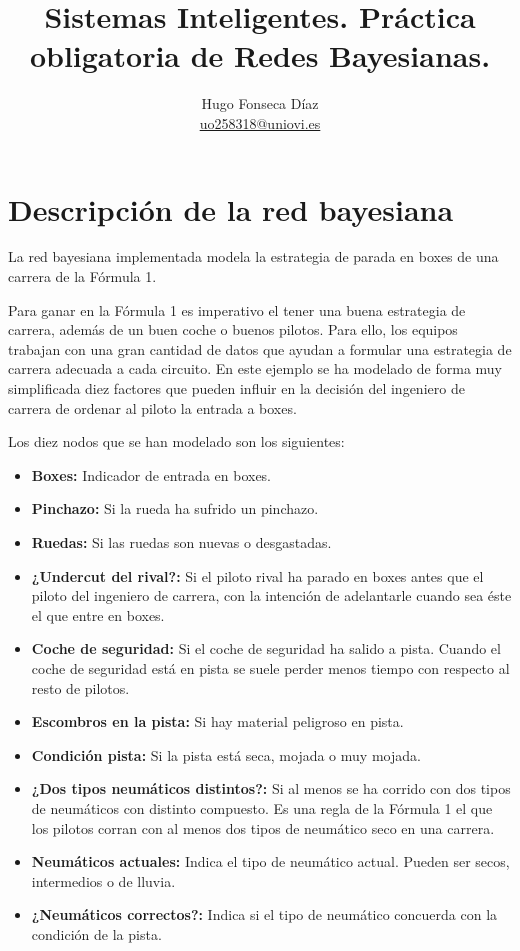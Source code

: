 \documentclass[]{article}
\begin{document}
\title{Sistemas Inteligentes. Práctica obligatoria de Redes Bayesianas.}
\author{Hugo Fonseca Díaz\\ \href{mailto:uo258318@uniovi.es}{uo258318@uniovi.es}}
\maketitle
\section{Descripción de la red bayesiana}
La red bayesiana implementada modela la estrategia de parada en boxes de una carrera de la Fórmula 1.

Para ganar en la Fórmula 1 es imperativo el tener una buena estrategia de carrera, además de un buen coche o buenos pilotos. Para ello, los equipos trabajan con una gran cantidad de datos que ayudan a formular una estrategia de carrera adecuada a cada circuito. En este ejemplo se ha modelado de forma muy simplificada diez factores que pueden influir en la decisión del ingeniero de carrera de ordenar al piloto la entrada a boxes.

Los diez nodos que se han modelado son los siguientes:
\begin{itemize}
    \item \textbf{Boxes:} Indicador de entrada en boxes.
    \item \textbf{Pinchazo:} Si la rueda ha sufrido un pinchazo.
    \item \textbf{Ruedas:} Si las ruedas son nuevas o desgastadas.
    \item \textbf{¿Undercut del rival?:} Si el piloto rival ha parado en boxes antes que el piloto del ingeniero de carrera, con la intención de adelantarle cuando sea éste el que entre en boxes.
    \item \textbf{Coche de seguridad:} Si el coche de seguridad ha salido a pista. Cuando el coche de seguridad está en pista se suele perder menos tiempo con respecto al resto de pilotos.
    \item \textbf{Escombros en la pista:} Si hay material peligroso en pista.
    \item \textbf{Condición pista:} Si la pista está seca, mojada o muy mojada.
    \item \textbf{¿Dos tipos neumáticos distintos?:} Si al menos se ha corrido con dos tipos de neumáticos con distinto compuesto. Es una regla de la Fórmula 1 el que los pilotos corran con al menos dos tipos de neumático seco en una carrera.
    \item \textbf{Neumáticos actuales:} Indica el tipo de neumático actual. Pueden ser secos, intermedios o de lluvia.
    \item \textbf{¿Neumáticos correctos?:} Indica si el tipo de neumático concuerda con la condición de la pista.
\end{itemize}
\end{document}
